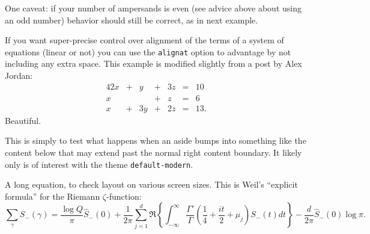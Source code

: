 \documentclass{amsart}
\theoremstyle{plain}%
\theoremstyle{definition}%
\theoremstyle{remark}%
\newcommand{\mono}[1]{\texttt{#1}}
\numberwithin{equation}{section}
\newcommand{\amp}{&}
\begin{document}
One caveat: if your number of ampersands is even (see advice above about using an odd number) behavior should still be correct, as in next example.%
\par
If you want super-precise control over alignment of the terms of a system of equations (linear or not) you can use the \mono{alignat} option to advantage by not including any extra space.  This example is modified slightly from a post by Alex Jordan:%
\begin{alignat*}{4}
2x \amp {}+{} \amp  y \amp {}+{} \amp 3z \amp {}={} \amp 10\\
x  \amp       \amp    \amp {}+{} \amp  z \amp {}={} \amp 6\\
x  \amp {}+{} \amp 3y \amp {}+{} \amp 2z \amp {}={} \amp 13.
\end{alignat*}
Beautiful.%
\begin{aside}\label{section-mathematics-4-8}%
%
This is simply to test what happens when an aside bumps into something like the content below that may extend past the normal right content boundary. It likely only is of interest with the theme \mono{default-modern}.%
\end{aside}
A long equation, to check layout on various screen sizes.  This is Weil's ``explicit formula'' for the Riemann \(\zeta\)-function:%
\begin{equation}
\sum_\gamma S_-(\gamma) = \frac{\log Q}{\pi} \hat S_-(0)
+ \frac{1}{2\pi} \sum_{j=1}^d \Re\left\{ \int_{-\infty}^\infty \frac{\Gamma'}{\Gamma}\left(\frac{1}{4} + \frac{it}{2} + \mu_j\right)S_-(t) dt\right\}
- \frac{d}{2\pi}\hat S_-(0)\log \pi\text{.}\label{section-mathematics-4-9-3}
\end{equation}
%
\end{document}
